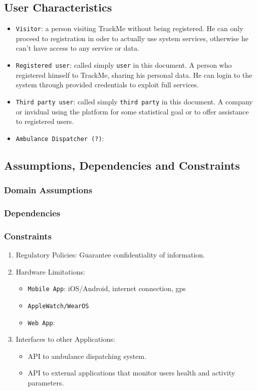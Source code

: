 \documentclass[12pt,a4paper]{article}
\begin{document}
		\subsection{User Characteristics}
			\begin{itemize}
				\item \texttt{Visitor}: a person visiting TrackMe without being registered. He can only proceed to registration in oder to actually use system services, otherwise he can't have access to any service or data.
				\item \texttt{Registered user}: called simply \texttt{user} in this document. A person who registered himself to TrackMe, sharing his personal data. He can login to the system through provided credentials to exploit full services.
				\item \texttt{Third party user}: called simply \texttt{third party} in this document. A company or invidual using the platform for some statistical goal or to offer assistance to registered users.
				\item \texttt{Ambulance Dispatcher (?)}:
			\end{itemize}
		
		\subsection{Assumptions, Dependencies and Constraints}
			\subsubsection{Domain Assumptions}
			\subsubsection{Dependencies}
			\subsubsection{Constraints}
				\begin{enumerate}
					\item Regulatory Policies:
							Guarantee confidentiality of information.
					\item Hardware Limitations: 
						\begin{itemize}
							\item \texttt{Mobile App}: iOS/Android, internet connection, gps
							\item \texttt{AppleWatch/WearOS}
							\item \texttt{Web App}: 
						\end{itemize}
					\item Interfaces to other Applications: 
						\begin{itemize}
							\item API to ambulance dispatching system.
							\item API to external applications that monitor users health and activity parameters.
						\end{itemize}
				\end{enumerate}
		
\end{document}
